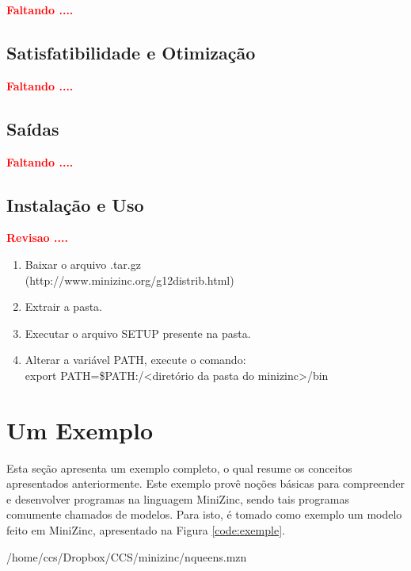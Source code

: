 {\bf \textcolor{red}{Faltando ....}}
\subsection{Satisfatibilidade e Otimização}

{\bf \textcolor{red}{Faltando ....}}
\subsection{Saídas}

{\bf \textcolor{red}{Faltando ....}}


\subsection{Instalação e Uso}

{\bf \textcolor{red}{Revisao ....}}


\begin{enumerate}   

\item Baixar o arquivo .tar.gz \\\hspace*{0.3cm}(http://www.minizinc.org/g12distrib.html)
\item Extrair a pasta.
\item Executar o arquivo SETUP presente na pasta.
\item Alterar a variável PATH, execute o comando:
\\export PATH=\$PATH:/\textless diretório da pasta do 
minizinc\textgreater/bin
\end{enumerate}





\section{Um Exemplo}

Esta seção apresenta um exemplo completo, o qual  resume os conceitos apresentados anteriormente.
Este exemplo provê noções básicas para compreender e desenvolver programas na linguagem MiniZinc, sendo tais programas comumente chamados de modelos. Para isto, é tomado como exemplo um modelo feito em MiniZinc, apresentado na Figura \ref{code:exemple}.


    {/home/ccs/Dropbox/CCS/minizinc/nqueens.mzn}


